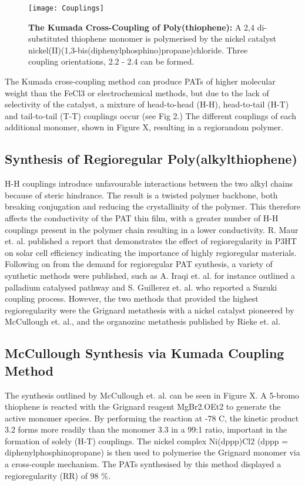 \begin{figure}[h]
\centering
\texttt{[image: Couplings]}
\caption{\textbf{The Kumada Cross-Coupling of Poly(thiophene):} A 2,4 di-substituted thiophene monomer is polymerised by the nickel catalyst nickel(II)(1,3-bis(diphenylphosphino)propane)chloride. Three coupling orientations, 2.2 - 2.4 can be formed.}
\centering
\end{figure}

The Kumada cross-coupling method can produce PATs of higher molecular weight than the FeCl3 or electrochemical methods, but due to the lack of selectivity of the catalyst, a mixture of head-to-head (H-H), head-to-tail (H-T) and tail-to-tail (T-T) couplings occur (see Fig 2.) The different couplings of each additional monomer, shown in Figure X, resulting in a regiorandom polymer.

\subsection{Synthesis of Regioregular Poly(alkylthiophene)}

H-H couplings introduce unfavourable interactions between the two alkyl chains because of steric hindrance. The result is a twisted polymer backbone, both breaking conjugation and reducing the crystallinity of the polymer. This therefore affects the conductivity of the PAT thin film, with a greater number of H-H couplings present in the polymer chain resulting in a lower conductivity. R. Maur et. al. published a report that demonstrates the effect of regioregularity in P3HT on solar cell efficiency indicating the importance of highly regioregular materials. 
Following on from the demand for regioregular PAT synthesis, a variety of synthetic methods were published, such as A. Iraqi et. al. for instance outlined a palladium catalysed pathway and S. Guillerez et. al. who reported a Suzuki coupling process. However, the two methods that provided the highest regioregularity were the Grignard metathesis with a nickel catalyst pioneered by McCullough et. al., and the organozinc metathesis published by Rieke et. al.

\subsection{McCullough Synthesis via Kumada Coupling Method}

The synthesis outlined by McCullough et. al. can be seen in Figure X. A 5-bromo thiophene is reacted with the Grignard reagent MgBr2.OEt2 to generate the active monomer species. By performing the reaction at -78 C, the kinetic product 3.2 forms more readily than the monomer 3.3 in a 99:1 ratio, important in the formation of solely (H-T) couplings. The nickel complex Ni(dppp)Cl2 (dppp = diphenylphosphinopropane) is then used to polymerise the Grignard monomer via a cross-couple mechanism. The PATs synthesised by this method displayed a regioregularity (RR) of 98 \%.

